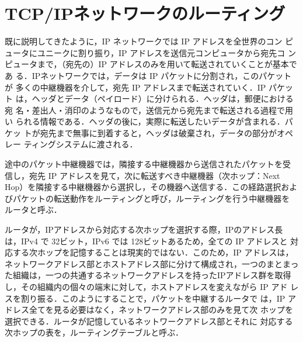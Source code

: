 \section{TCP/IPネットワークのルーティング}
既に説明してきたように，IP ネットワークでは IP アドレスを全世界のコン
ピュータにユニークに割り振り，IP アドレスを送信元コンピュータから宛先コ
ンピュータまで，（宛先の）IP アドレスのみを用いて転送されていくことが基本であ
る．IPネットワークでは，データは IP パケットに分割され，このパケットが
多くの中継機器を介して，宛先 IP アドレスまで転送されていく．IP パケット
は，ヘッダとデータ（ペイロード）に分けられる．ヘッダは，郵便における宛
名・差出人・消印のようなもので，送信元から宛先まで転送される過程で用い
られる情報である．ヘッダの後に，実際に転送したいデータが含まれる．パケッ
トが宛先まで無事に到着すると，ヘッダは破棄され，データの部分がオペレー
ティングシステムに渡される．

途中のパケット中継機器では，隣接する中継機器から送信されたパケットを受
信し，宛先 IP アドレスを見て，次に転送すべき中継機器（次ホップ：Next
Hop）を隣接する中継機器から選択し，その機器へ送信する．この経路選択およ
びパケットの転送動作をルーティングと呼び，ルーティングを行う中継機器を
ルータと呼ぶ．

ルータが，IPアドレスから対応する次ホップを選択する際，IPのアドレス長
は，IPv4 で 32ビット，IPv6 では 128ビットあるため，全ての IP アドレスと
対応する次ホップを記憶することは現実的ではない．このため，IP アドレスは，
ネットワークアドレス部とホストアドレス部に分けて構成され，一つのまとまっ
た組織は，一つの共通するネットワークアドレスを持ったIPアドレス群を取得
し，その組織内の個々の端末に対して，ホストアドレスを変えながら IP アド
レスを割り振る．このようにすることで，パケットを中継するルータで
は，IP アドレス全てを見る必要はなく，ネットワークアドレス部のみを見て次
ホップを選択できる．ルータが記憶しているネットワークアドレス部とそれに
対応する次ホップの表を，ルーティングテーブルと呼ぶ．

